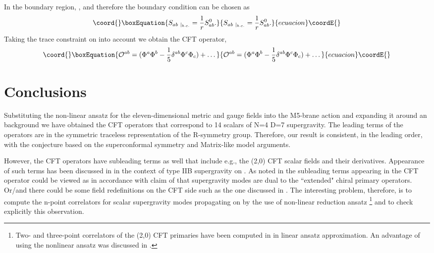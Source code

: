 \documentclass[a4paper,11pt]{article}
\begin{document}
In the boundary region, \coordHE{}, \coordHE{} and therefore the boundary condition can be chosen as
\begin{equation}\coord{}\boxEquation{\plabel{Sbc}
S_{ab~\vert_{b.c.}}={1\over r}S^{0}_{ab}.
}{S_{ab~\vert_{b.c.}}={1\over r}S^{0}_{ab}.
}{ecuacion}\coordE{}\end{equation}
Taking the trace constraint on \coordHE{} into account we obtain the
CFT operator,
\begin{equation}\coord{}\boxEquation{\plabel{CFT}
{\cal O}^{ab}=(\Phi^a \Phi^b-{1\over 5}\d^{ab}\Phi^c \Phi_c)+\dots
}{{\cal O}^{ab}=(\Phi^a \Phi^b-{1\over 5}\d^{ab}\Phi^c \Phi_c)+\dots
}{ecuacion}\coordE{}\end{equation}




\section{Conclusions}


Substituting the non-linear ansatz for the eleven-dimensional metric and
 gauge fields into the M5-brane action and expanding it around an
\coordHE{} background we have obtained the CFT
 operators that correspond
to 14 scalars of N=4 D=7 supergravity. The leading terms of the
operators are in the symmetric
traceless representation of the \coordHE{} R-symmetry group. Therefore,
 our result is consistent, in the leading order, with
the conjecture based on the
superconformal symmetry and Matrix-like model arguments.

However, the CFT operators have subleading terms as well that
include e.g., the (2,0) CFT scalar fields and their derivatives.
Appearance of such terms has been discussed in \cite{frolov} in
the context of type IIB supergravity on \coordHE{}. As
noted in \cite{tran} the subleading terms appearing in the CFT
operator could be viewed as in accordance with claim of
\cite{frolov} that supergravity modes are dual to the ``extended"
chiral primary operators. Or/and there could be some field
redefinitions on the CFT side such as the one discussed in
\cite{gkpr}. The interesting problem, therefore, is to compute the
n-point correlators for scalar supergravity modes propagating on
\coordHE{} by the use of non-linear reduction ansatz \footnote{Two-
and three-point correlators of the (2,0) CFT primaries have been
computed in \cite{lin} in linear ansatz approximation. An
advantage of using the nonlinear ansatz was discussed in
\cite{nv}.} and to check explicitly this observation.
\end{document}
